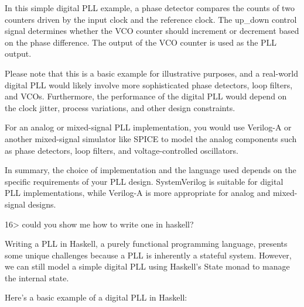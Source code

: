 \documentclass[
]{article}
\begin{document}
In this simple digital PLL example, a phase detector compares the counts
of two counters driven by the input clock and the reference clock. The
up\_down control signal determines whether the VCO counter should
increment or decrement based on the phase difference. The output of the
VCO counter is used as the PLL output.

Please note that this is a basic example for illustrative purposes, and
a real-world digital PLL would likely involve more sophisticated phase
detectors, loop filters, and VCOs. Furthermore, the performance of the
digital PLL would depend on the clock jitter, process variations, and
other design constraints.

For an analog or mixed-signal PLL implementation, you would use
Verilog-A or another mixed-signal simulator like SPICE to model the
analog components such as phase detectors, loop filters, and
voltage-controlled oscillators.

In summary, the choice of implementation and the language used depends
on the specific requirements of your PLL design. SystemVerilog is
suitable for digital PLL implementations, while Verilog-A is more
appropriate for analog and mixed-signal designs.

16\textgreater{} could you show me how to write one in haskell?

Writing a PLL in Haskell, a purely functional programming language,
presents some unique challenges because a PLL is inherently a stateful
system. However, we can still model a simple digital PLL using Haskell's
State monad to manage the internal state.

Here's a basic example of a digital PLL in Haskell:
\end{document}
